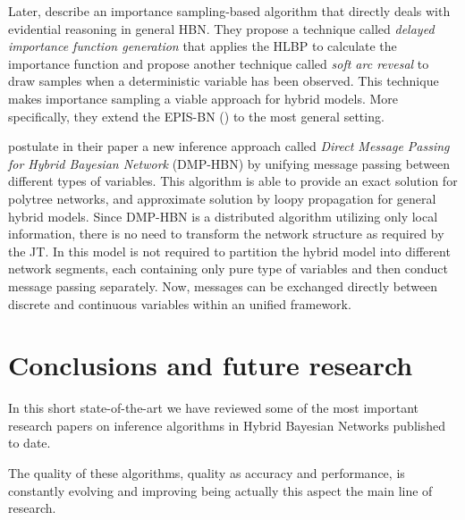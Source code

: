 \documentclass[a4paper,11pt]{article}
\begin{document}
Later, \cite{yuanmarek2007}  describe an importance sampling-based algorithm that directly deals with evidential reasoning in general HBN. They propose a technique called \textit{delayed importance function generation} that applies the HLBP to calculate the importance function and propose another technique called \textit{soft arc revesal} to draw samples when a deterministic variable has been observed. This technique makes importance sampling a viable approach for hybrid models. More specifically, they extend the EPIS-BN (\cite{yuandruzdzel2006}) to the most general setting. 

\cite{scalable2010} postulate in their paper a new inference approach called \textit{Direct Message Passing for Hybrid Bayesian Network} (DMP-HBN) by unifying message passing between different types of variables. This algorithm is able to provide an exact solution for polytree networks, and approximate solution by loopy propagation for general hybrid models. 
Since DMP-HBN is a distributed algorithm utilizing only local information, there is no need to transform the network structure as required by the JT.  In this model is not required to partition the hybrid model into different network segments, each containing only pure type of variables and then conduct message passing separately. Now, messages can be exchanged directly between discrete and continuous variables within an unified framework.

\section{Conclusions and future research}

In this short state-of-the-art we have reviewed some of the most important research papers on inference algorithms in Hybrid Bayesian Networks published to date.

The quality of these algorithms, quality as accuracy and performance, is constantly evolving and improving being actually this aspect the main line of research.
\end{document}
